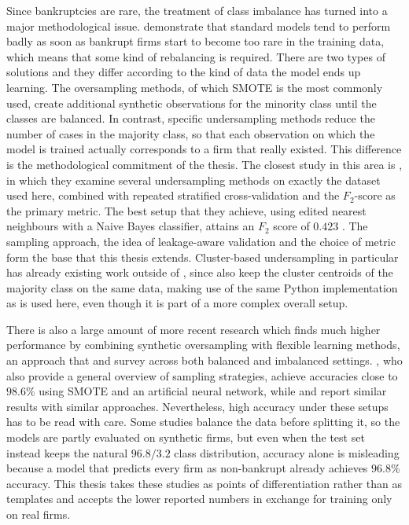 Since bankruptcies are rare, the treatment of class imbalance has turned into a
major methodological issue. \textcite{veganzones2018} demonstrate that standard
models tend to perform badly as soon as bankrupt firms start to become too rare
in the training data, which means that some kind of rebalancing is required.
There are two types of solutions and they differ according to the kind of data
the model ends up learning. The oversampling methods, of which SMOTE
\parencite{chawla2002} is the most commonly used, create additional synthetic
observations for the minority class until the classes are balanced. In contrast,
specific undersampling methods reduce the number of cases in the majority class, so
that each observation on which the model is trained actually corresponds to a
firm that really existed. This difference is the methodological commitment of
the thesis. The closest study in this area is \textcite{wangliu2021}, in which
they examine several undersampling methods on exactly the dataset used here,
combined with repeated stratified cross-validation and the $F_2$-score as the
primary metric. The best setup that they achieve, using edited nearest
neighbours with a Naive Bayes classifier, attains an $F_2$ score of
$0.423$ \parencite[12]{wangliu2021}. The sampling approach, the idea of
leakage-aware validation and the choice of metric form the base that this thesis
extends. Cluster-based undersampling in particular has already existing work
outside of \textcite{wangliu2021}, since \textcite[11]{ansahnarh2024} also keep the
cluster centroids of the majority class on the same data, making use of the same
Python implementation as is used here, even though it is part of a more complex
overall setup.

There is also a large amount of more recent research which finds much higher
performance by combining synthetic oversampling with flexible learning methods,
an approach that \textcite{liashenko2023} and \textcite{amirshahi2024} survey
across both balanced and imbalanced settings. \textcite[305]{pham2025}, who also
provide a general overview of sampling strategies, achieve accuracies close to
$98.6\%$ using SMOTE and an artificial neural network, while \textcite{suresh2025}
and \textcite{sinap2025} report similar results with similar approaches.
Nevertheless, high accuracy under these setups has to be read with care. 
Some studies balance the data before splitting it, so the models are partly 
evaluated on synthetic firms, but even when the test set instead keeps the 
natural $96.8/3.2$ class distribution, accuracy alone is misleading because a 
model that predicts every firm as non-bankrupt already achieves $96.8\%$ accuracy.
This thesis takes these studies as points of differentiation rather than as 
templates and accepts the lower reported numbers in exchange for training only 
on real firms.

